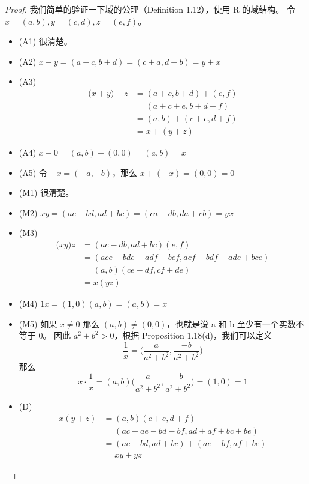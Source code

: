 \documentclass[../poma-notes.tex]{subfiles}
\begin{document}
\begin{proof}
	我们简单的验证一下域的公理（Definition 1.12），使用 R 的域结构。
	令 $x=(a,b), y=(c,d), z=(e,f)$。
	\begin{itemize}
		\item[] (A1) 很清楚。
		\item[] (A2) $x+y = (a+c,b+d) = (c+a,d+b) = y+x$
		\item[] (A3)
			\vspace{-26pt}
			\begin{align*}
				\mathcal (x+y)+z & = (a+c,b+d) + (e,f) \\
				                 & = (a+c+e, b+d+f)    \\
				                 & = (a,b) + (c+e,d+f) \\
				                 & = x+(y+z)
			\end{align*}
		\item[] (A4) $x+0 = (a,b) + (0,0) = (a,b) = x$
		\item[] (A5) 令 $-x = (-a,-b)$，那么 $x+(-x) = (0,0) = 0$
		\item[] (M1) 很清楚。
		\item[] (M2) $xy = (ac-bd,ad+bc) = (ca-db,da+cb) = yx$
		\item[] (M3)
			\vspace{-26pt}
			\begin{align*}
				\mathcal (xy)z & = (ac-db,ad+bc)(e,f)                \\
				               & = (ace-bde-adf-bef,acf-bdf+ade+bce) \\
				               & = (a,b)(ce-df,cf+de)                \\
				               & = x(yz)
			\end{align*}
		\item[] (M4) $1x  =(1,0)(a,b) = (a,b) = x$
		\item[] (M5) 如果 $x \ne 0$ 那么 $(a,b) \ne (0,0)$，也就是说 a 和 b 至少有一个实数不等于 0。
			因此 $a^2+b^2>0$，根据 Proposition 1.18(d)，我们可以定义
			\[\frac{1}{x} = \bigl(\frac{a}{a^2+b^2}, \frac{-b}{a^2+b^2}\bigr)\]
			那么
			\[x \cdot \frac{1}{x} = (a,b)\bigl(\frac{a}{a^2+b^2}, \frac{-b}{a^2+b^2}\bigr) = (1,0) = 1\]
		\item[] (D)
			\vspace{-26pt}
			\begin{align*}
				\mathcal{} x(y+z) & = (a,b)(c+e,d+f)                \\
				                  & = (ac+ae-bd-bf,ad+af+bc+be)     \\
				                  & = (ac-bd,ad+bc) + (ae-bf,af+be) \\
				                  & = xy + yz
			\end{align*}
	\end{itemize}
\end{proof}
\end{document}
